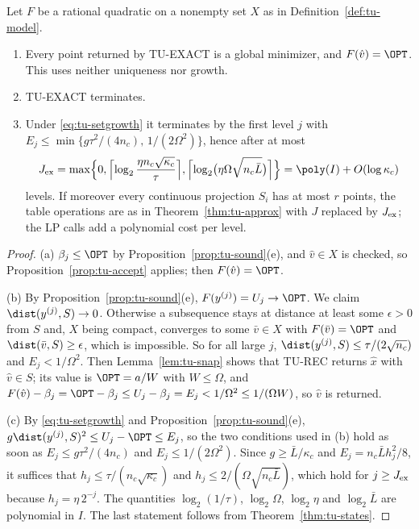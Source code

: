 \begin{theorem}\label{thm:tu-exact}
Let $F$ be a rational quadratic on a nonempty set $X$ as in
Definition~\ref{def:tu-model}.
\begin{enumerate}[label=(\alph*)]
\item Every point returned by TU-EXACT is a global minimizer, and
$F(\hat v)=\OPT$. This uses neither uniqueness nor growth.
\item TU-EXACT terminates.
\item Under \eqref{eq:tu-setgrowth} it terminates by the first level $j$ with
$E_j\le\min\{g\tau^2/(4n_c),\,1/(2\Omega^2)\}$, hence after at most
\[
J_{\rm ex}=\max\Bigl\{0,\Bigl\lceil\log_2\frac{\eta n_c\sqrt{\kappa_c}}{\tau}\Bigr\rceil,
\Bigl\lceil\log_2\bigl(\eta\Omega\sqrt{n_c\bar L}\bigr)\Bigr\rceil\Bigr\}
=\poly(I)+O(\log\kappa_c)
\]
levels. If moreover every continuous projection $S_i$ has at most $r$ points,
the table operations are as in Theorem~\ref{thm:tu-approx} with $J$ replaced
by $J_{\rm ex}$; the LP calls add a polynomial cost per level.
\end{enumerate}
\end{theorem}

\begin{proof}
(a) $\beta_j\le\OPT$ by Proposition~\ref{prop:tu-sound}(e), and $\hat v\in X$ is
checked, so Proposition~\ref{prop:tu-accept} applies; then $F(\hat v)=\OPT$.

(b) By Proposition~\ref{prop:tu-sound}(e), $F(y^{(j)})=U_j\to\OPT$. We claim
$\dist(y^{(j)},S)\to0$. Otherwise a subsequence stays at distance at least
some $\epsilon>0$ from $S$ and, $X$ being compact, converges to some
$\bar v\in X$ with $F(\bar v)=\OPT$ and $\dist(\bar v,S)\ge\epsilon$, which is
impossible. So for all large $j$, $\dist(y^{(j)},S)\le\tau/(2\sqrt{n_c})$ and
$E_j<1/\Omega^2$. Then Lemma~\ref{lem:tu-snap} shows that TU-REC returns
$\hat x$ with $\hat v\in S$; its value is $\OPT=a/W$ with $W\le\Omega$, and
$F(\hat v)-\beta_j=\OPT-\beta_j\le U_j-\beta_j=E_j<1/\Omega^2\le1/(\Omega W)$, so
$\hat v$ is returned.

(c) By \eqref{eq:tu-setgrowth} and Proposition~\ref{prop:tu-sound}(e),
$g\dist(y^{(j)},S)^2\le U_j-\OPT\le E_j$, so the two conditions used in (b)
hold as soon as $E_j\le g\tau^2/(4n_c)$ and $E_j\le1/(2\Omega^2)$. Since
$g\ge\bar L/\kappa_c$ and $E_j=n_c\bar Lh_j^2/8$, it suffices that
$h_j\le\tau/(n_c\sqrt{\kappa_c})$ and $h_j\le2/(\Omega\sqrt{n_c\bar L})$, which hold
for $j\ge J_{\rm ex}$ because $h_j=\eta\,2^{-j}$. The quantities $\log_2(1/\tau)$, $\log_2\Omega$,
$\log_2\eta$ and $\log_2\bar L$ are polynomial in $I$. The last statement
follows from Theorem~\ref{thm:tu-states}.
\end{proof}

